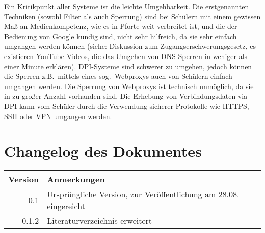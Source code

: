 \documentclass[10pt,a4paper,notitlepage]{scrartcl}
\begin{document}
\begin{multicols}{2}
Ein Kritikpunkt aller Systeme ist die leichte Umgehbarkeit. Die erstgenannten Techniken (sowohl Filter als auch Sperrung) sind bei Schülern mit einem gewissen Maß an Medienkompetenz, wie es in Pforte weit verbreitet ist, und die der Bedienung von Google kundig sind, nicht sehr hilfreich, da sie sehr einfach umgangen werden können (siehe: Diskussion zum \glqq Zugangserschwerungsgesetz\grqq, es existieren YouTube-Videos, die das Umgehen von DNS-Sperren in weniger als einer Minute erklären).
DPI-Systeme sind schwerer zu umgehen, jedoch können die Sperren z.B.\ mittels eines sog.\ Webproxys auch von Schülern einfach umgangen werden. Die Sperrung von Webproxys ist technisch unmöglich, da sie in zu großer Anzahl vorhanden sind. Die Erhebung von Verbindungsdaten via DPI kann vom Schüler durch die Verwendung sicherer Protokolle wie HTTPS, SSH oder VPN umgangen werden.
\end{multicols}
\newpage
\section*{Changelog des Dokumentes}
\begin{tabularx}{\textwidth}{r|l}
\textbf{Version}&\textbf{Anmerkungen}\\\hline
0.1&Ursprüngliche Version, zur Veröffentlichung am 28.08. eingereicht\\
0.1.2&Literaturverzeichnis erweitert
\end{tabularx}
\end{document}
